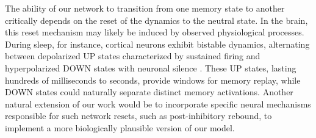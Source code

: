\documentclass[10pt,letterpaper]{article}
\begin{document}
The ability of our network to transition from one memory state to another critically depends on the reset of the dynamics to the neutral state. In the brain, this reset mechanism may likely be induced by observed physiological processes. During sleep, for instance, cortical neurons exhibit bistable dynamics, alternating between depolarized UP states characterized by sustained firing and hyperpolarized DOWN states with neuronal silence \cite{jercog_up-down_2017,luczak_sequential_2007,steriade_novel_nodate}. These UP states, lasting hundreds of milliseconds to seconds, provide windows for memory replay, while DOWN states could naturally separate distinct memory activations. Another natural extension of our work would be to incorporate specific neural mechanisms responsible for such network resets, such as post-inhibitory rebound, to implement a more biologically plausible version of our model.




\end{document}
